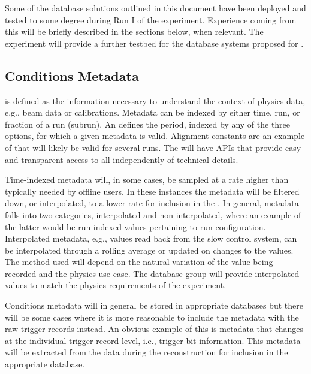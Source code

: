 \documentclass[../main-v1.tex]{subfiles}
\begin{document}
Some of the database solutions outlined in this document have been deployed and tested to some degree during Run I of the  experiment. Experience coming from %
this will be briefly described in the sections below, when relevant. %
The  experiment will provide a further testbed for the database systems proposed for .  

\subsection{Conditions Metadata}
\label{subsec:db:conditions_metadata} 

is defined as the information necessary to understand the context of physics data, e.g., beam data or calibrations.
Metadata can be indexed by either %
time, run, or fraction of a run (subrun). 
An 
defines the period, indexed by any of the three options, for which a given metadata is valid.
Alignment constants are an example of  that will likely be valid for several runs. 
The   will have APIs that provide easy and transparent access to all  independently of technical details.

Time-indexed metadata will, in some cases, be sampled at a rate higher than typically needed by offline users. In these instances the metadata will be filtered down, or interpolated, to a lower rate for inclusion in the . In general, metadata falls into two categories, interpolated and non-interpolated, where an example of the latter would be run-indexed values pertaining to run configuration. Interpolated metadata, e.g., values read back from the slow control system, can be interpolated through a rolling average or updated on changes to the values. The method used will depend on the natural variation of the value being recorded and the physics use case. 
The database group will provide interpolated values to match the physics requirements of the experiment.  

Conditions metadata will in general be stored in appropriate databases but there will be some cases where it is more reasonable to include the metadata with the raw trigger records instead. An obvious example of this is metadata that changes at the individual trigger record level, i.e., trigger bit information. This metadata will be extracted from the data during the reconstruction for inclusion in the appropriate database. 
\end{document}
